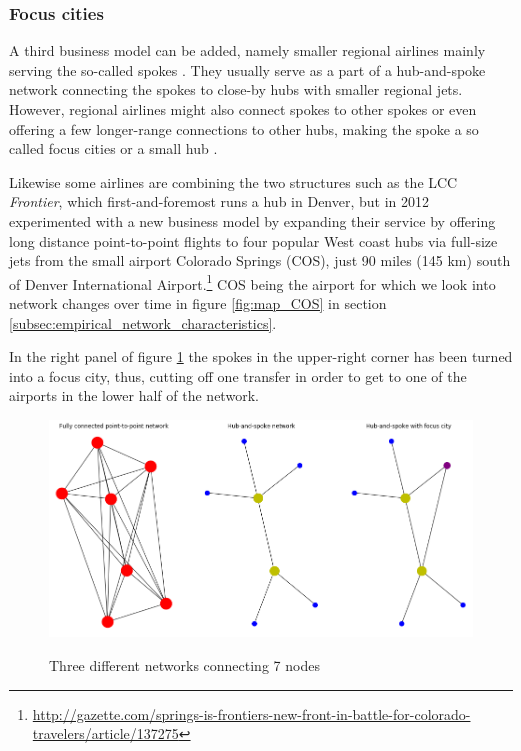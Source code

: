 \subsubsection{Focus cities}
\label{subsec:focus_cities}
A third business model can be added, namely smaller regional airlines mainly serving the so-called spokes \citep{forbes2007role}. They usually serve as a part of a hub-and-spoke network connecting the spokes to close-by hubs with smaller regional jets. However, regional airlines might also connect spokes to other spokes or even offering a few longer-range connections to other hubs, making the spoke a so called focus cities or a small hub \citep{mammarella2014encyclopedia}.
\par
Likewise some airlines are combining the two structures such as the LCC \textit{Frontier}, which first-and-foremost runs a hub in Denver, but in 2012 experimented with a new business model by expanding their service by offering long distance point-to-point flights to four popular West coast hubs via full-size jets from the small airport Colorado Springs (COS), just 90 miles (145 km) south of Denver International Airport.\footnote{\href{https://web.archive.org/web/20160526231749/http://gazette.com/springs-is-frontiers-new-front-in-battle-for-colorado-travelers/article/137275}{http://gazette.com/springs-is-frontiers-new-front-in-battle-for-colorado-travelers/article/137275}} COS being the airport for which we look into network changes over time in figure \ref{fig:map_COS} in section \ref{subsec:empirical_network_characteristics}.
\par
In the right panel of figure \ref{fig:different_networks} the spokes in the upper-right corner has been turned into a focus city, thus, cutting off one transfer in order to get to one of the airports in the lower half of the network.
\begin{figure}[H]
  \centering
  \caption{Three different networks connecting 7 nodes}
    \includegraphics[width=\linewidth]{Exam/Figures/network_types}
    \vspace{-0.7cm}
  \label{fig:different_networks}
\end{figure}


